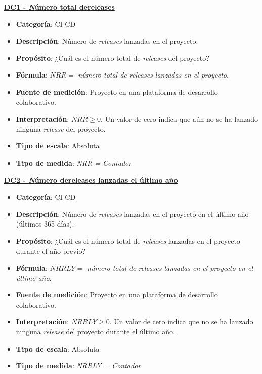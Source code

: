 \textbf{\underline{DC1 - \textit Número total de{releases}}}
\begin{itemize}
	\item \textbf{Categoría}: CI-CD
	\item \textbf{Descripción}: Número de \textit{releases} lanzadas en el proyecto.
	\item \textbf{Propósito}: ¿Cuál es el número total de \textit{releases} del  proyecto?
	\item \textbf{Fórmula}: $NRR =$ \textit{número total de releases lanzadas en el proyecto}.
	\item \textbf{Fuente de medición}: Proyecto en una plataforma de desarrollo colaborativo.
	\item \textbf{Interpretación}: $NRR \geq 0$. Un valor de cero indica que aún no se ha lanzado ninguna \textit{release} del proyecto.
	\item \textbf{Tipo de escala}: Absoluta
	\item \textbf{Tipo de medida}: \textit{NRR = Contador}
\end{itemize}

\textbf{\underline{DC2 - \textit Número de{releases} lanzadas el último año}}
\begin{itemize}
	\item \textbf{Categoría}: CI-CD
	\item \textbf{Descripción}: Número de \textit{releases} lanzadas en el proyecto en el último año (últimos 365 días).
	\item \textbf{Propósito}: ¿Cuál es el número total de \textit{releases} lanzadas en el proyecto durante el año previo?
	\item \textbf{Fórmula}: $NRRLY =$ \textit{número total de releases lanzadas en el proyecto en el último año}.
	\item \textbf{Fuente de medición}: Proyecto en una plataforma de desarrollo colaborativo.
	\item \textbf{Interpretación}: $NRRLY \geq 0$. Un valor de cero indica que no se ha lanzado ninguna \textit{release} del proyecto durante el último año.
	\item \textbf{Tipo de escala}: Absoluta
	\item \textbf{Tipo de medida}: \textit{NRRLY = Contador}
\end{itemize}

